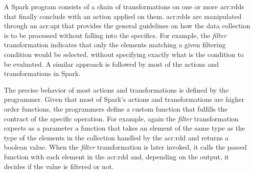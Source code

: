 \label{sec:conceptual-process}






A Spark program consists of a chain of transformations on one or more \acrshort{acr:rdd}s that finally conclude with an action applied on them. \acrshort{acr:rdd}s are manipulated through an \acrshort{acr:api} that provides the general guidelines on how the data collection is to be processed without falling into the specifics. For example, the \textit{filter} transformation indicates that only the elements matching a given filtering condition would be selected, without specifying exactly what is the condition to be evaluated. A similar approach is followed by most of the actions and transformations in Spark.

The precise behavior of most actions and transformations is defined by the programmer. Given that most of Spark's actions and transformations are higher order functions, the programmers define a custom function that fulfills the contract of the specific operation. For example, again the \textit{filter} transformation expects as a parameter a function that takes an element of the same type as the type of the elements in the collection handled by the \acrshort{acr:rdd} and returns a boolean value. When the \textit{filter} transformation is later invoked, it calls the passed function with each element in the \acrshort{acr:rdd} and, depending on the output, it decides if the value is filtered or not.


